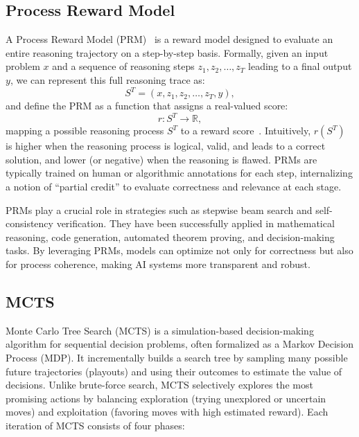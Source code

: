\subsection{Process Reward Model}
A Process Reward Model (PRM)~\citep{uesato2022solvingmathwordproblems,pfau2024lets} is a reward model designed to evaluate an entire reasoning trajectory on a step-by-step basis. Formally, given an input problem $x$ and a sequence of reasoning steps $z_1, z_2, \dots, z_T$ leading to a final output $y$, we can represent this full reasoning trace as:
\[
    S^T = (x, z_1, z_2, \dots, z_T, y),
\]
and define the PRM as a function that assigns a real-valued score:
\[
    r: S^T \to \mathbb{R},
\]
mapping a possible reasoning process $S^T$ to a reward score~\citep{choudhury2025processrewardmodelsllm,ma2025steplevelrewardmodelsrewarding}. Intuitively, $r(S^T)$ is higher when the reasoning process is logical, valid, and leads to a correct solution, and lower (or negative) when the reasoning is flawed. PRMs are typically trained on human or algorithmic annotations for each step, internalizing a notion of ``partial credit'' to evaluate correctness and relevance at each stage.


PRMs play a crucial role in \TTS strategies such as stepwise beam search and self-consistency verification. They have been successfully applied in mathematical reasoning, code generation, automated theorem proving, and decision-making tasks. By leveraging PRMs, models can optimize not only for correctness but also for process coherence, making AI systems more transparent and robust.

\subsection{MCTS}

Monte Carlo Tree Search (MCTS) is a simulation-based decision-making algorithm for sequential decision problems, often formalized as a Markov Decision Process (MDP). It incrementally builds a search tree by sampling many possible future trajectories (playouts) and using their outcomes to estimate the value of decisions. Unlike brute-force search, MCTS selectively explores the most promising actions by balancing exploration (trying unexplored or uncertain moves) and exploitation (favoring moves with high estimated reward). Each iteration of MCTS consists of four phases:

